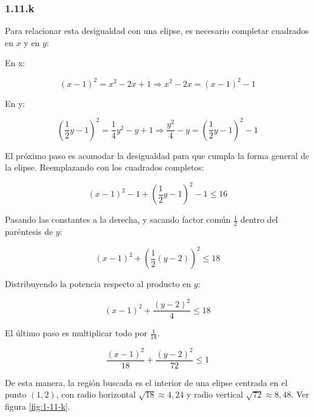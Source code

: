 \documentclass{article}
\begin{document}
\subsubsection*{1.11.k}
\label{subsubsec:1.11.k}

Para relacionar esta desigualdad con una elipse, es necesario completar cuadrados en $x$ y en $y$:

En x:

\begin{equation}
(x-1)^2 = x^2 -2x + 1 \Rightarrow x^2 - 2x = (x-1)^2 - 1
\end{equation}

En y:

\begin{equation}
\left (\frac{1}{2} y - 1 \right)^2 = \frac{1}{4}y^2 - y + 1 \Rightarrow \frac{y^2}{4} - y = (\frac{1}{2} y - 1)^2 - 1
\end{equation}

El próximo paso es acomodar la desigualdad para que cumpla la forma general de la elipse. Reemplazando con los cuadrados completos:

\begin{equation}
(x-1)^2 - 1 + \left( \frac{1}{2} y - 1 \right)^2 - 1 \leq 16
\end{equation}

Pasando las constantes a la derecha, y sacando factor común $\frac{1}{2}$ dentro del paréntesis de $y$:

\begin{equation}
(x-1)^2 + \left( \frac{1}{2} (y - 2) \right)^2 \leq 18
\end{equation}

Distribuyendo la potencia respecto al producto en $y$:

\begin{equation}
(x-1)^2 + \frac{(y-2)^2}{4} \leq 18
\end{equation}

El último paso es multiplicar todo por $\frac{1}{18}$.

\begin{equation}
\frac{(x-1)^2}{18} + \frac{(y-2)^2}{72} \leq 1
\end{equation}

De esta manera, la región buscada es el interior de una elipse centrada en el punto $(1, 2)$, con radio horizontal $\sqrt{18} \approx 4,24$ y radio vertical $\sqrt{72} \approx 8,48$. Ver figura \ref{fig:1-11-k}.
\end{document}
